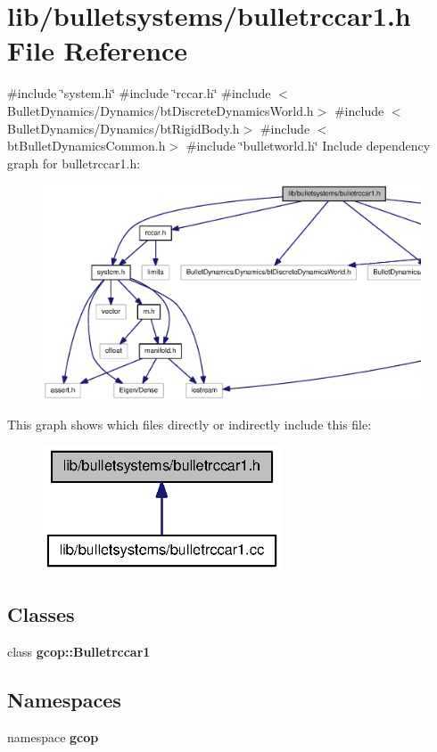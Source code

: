 \section{lib/bulletsystems/bulletrccar1.h \-File \-Reference}
\label{bulletrccar1_8h}
{\ttfamily \#include \char`\"{}system.\-h\char`\"{}}\*
{\ttfamily \#include \char`\"{}rccar.\-h\char`\"{}}\*
{\ttfamily \#include $<$\-Bullet\-Dynamics/\-Dynamics/bt\-Discrete\-Dynamics\-World.\-h$>$}\*
{\ttfamily \#include $<$\-Bullet\-Dynamics/\-Dynamics/bt\-Rigid\-Body.\-h$>$}\*
{\ttfamily \#include $<$bt\-Bullet\-Dynamics\-Common.\-h$>$}\*
{\ttfamily \#include \char`\"{}bulletworld.\-h\char`\"{}}\*
\-Include dependency graph for bulletrccar1.\-h\-:
\nopagebreak
\begin{figure}[H]
\begin{center}
\leavevmode
\includegraphics[width=350pt]{bulletrccar1_8h__incl}
\end{center}
\end{figure}
\-This graph shows which files directly or indirectly include this file\-:
\nopagebreak
\begin{figure}[H]
\begin{center}
\leavevmode
\includegraphics[width=200pt]{bulletrccar1_8h__dep__incl}
\end{center}
\end{figure}
\subsection*{\-Classes}
\begin{DoxyCompactItemize}
\item 
class {\bf gcop\-::\-Bulletrccar1}
\end{DoxyCompactItemize}
\subsection*{\-Namespaces}
\begin{DoxyCompactItemize}
\item 
namespace {\bf gcop}
\end{DoxyCompactItemize}
